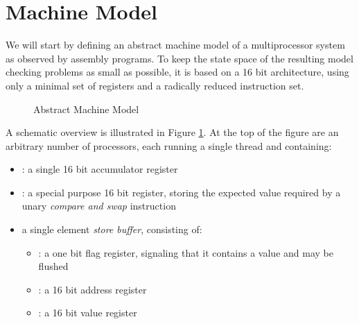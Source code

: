 \section{Machine Model}








We will start by defining an abstract machine model of a multiprocessor system as observed by assembly programs.
To keep the state space of the resulting model checking problems as small as possible, it is based on a 16 bit architecture, using only a minimal set of registers and a radically reduced instruction set.

\begin{figure}[h]
  \centering
  
  \caption{Abstract Machine Model}
  \label{fig:machine:overview}
\end{figure}

A schematic overview is illustrated in Figure \ref{fig:machine:overview}.
At the top of the figure are an arbitrary number of processors, each running a single thread and containing:

\begin{itemize}
  \item \ACCU: a single 16 bit accumulator register
  \item \MEM: a special purpose 16 bit register, storing the expected value required by a unary \emph{compare and swap} instruction
  \item a single element \emph{store buffer}, consisting of:
    \begin{itemize}
      \item \SBFULL: a one bit flag register, signaling that it contains a value and may be flushed
      \item \SBADR: a 16 bit address register
      \item \SBVAL: a 16 bit value register
    \end{itemize}
\end{itemize}

